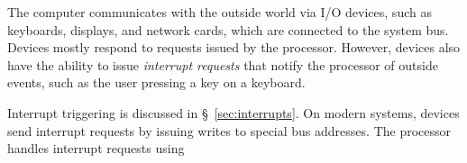 The computer communicates with the outside world via I/O devices, such as
keyboards, displays, and network cards, which are connected to the system bus.
Devices mostly respond to requests issued by the processor. However, devices
also have the ability to issue \textit{interrupt requests} that notify the
processor of outside events, such as the user pressing a key on a keyboard.

Interrupt triggering is discussed in \S~\ref{sec:interrupts}. On modern
systems, devices send interrupt requests by issuing writes to special bus
addresses. The processor handles interrupt requests using
